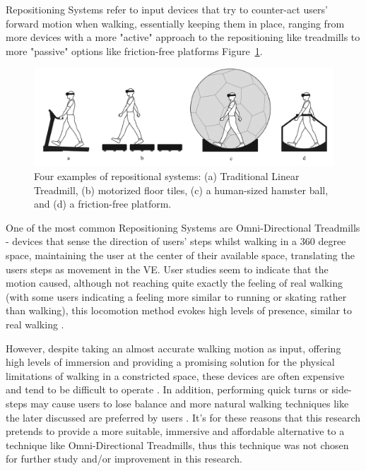 Repositioning Systems refer to input devices that try to counter-act users' forward motion when walking, essentially keeping them in place, 
ranging from more devices with a more "active" approach to the repositioning like treadmills to more "passive" options like friction-free
platforms Figure~\ref{fig:repo-systems}.

\begin{figure}[b]
    \centering
    \includegraphics[width=\textwidth]{NOVAthesisFiles/Images/papers/repo-systems.png}
    \caption{Four examples of repositional systems: (a) Traditional Linear Treadmill, (b) motorized floor tiles,
    (c) a human-sized hamster ball, and (d) a friction-free platform. \cite{Nilsson2018}}
    \label{fig:repo-systems}
\end{figure}


One of the most common Repositioning Systems are Omni-Directional Treadmills - devices that sense the direction of users' steps whilst 
walking in a 360 degree space, maintaining the user at the center of their available space, translating the users steps as movement in the \gls{VE}.
User studies seem to indicate that the motion caused, although not reaching quite exactly the feeling of real walking (with some users indicating a 
feeling more similar to running or skating rather than walking), this locomotion method evokes high levels of presence, similar to real walking \cite{Syamil2024}.

However, despite taking an almost accurate walking motion as input, offering high levels of immersion and providing a promising solution 
for the physical limitations of walking in a constricted space, these devices are often expensive and tend to be difficult to operate \cite{Cherni2020}.
In addition, performing quick turns or side-steps may cause users to lose balance \cite{Nilsson2018} and more natural walking techniques 
like the later discussed  are preferred by users \cite{Syamil2024}. It's for these reasons that this research 
pretends to provide a more suitable, immersive and affordable alternative to a technique like Omni-Directional Treadmills, thus this technique
was not chosen for further study and/or improvement in this research.  


